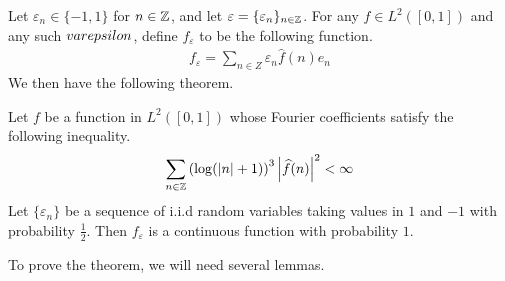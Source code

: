 \documentclass[11pt]{article}
\begin{document}
Let $\varepsilon_n \in \{-1, 1\}$ for $n \in \mathbb{Z}$, and let $\varepsilon = \{\varepsilon_n\}_{n \in \mathbb{Z}}$.
For any $f \in L^2([0,1])$ and any such $\\varepsilon$, define $f_{\varepsilon}$ to be the following function.
\begin{align*}
  f_{\varepsilon} = \sum_{n \in Z} \varepsilon_n \widehat{f}(n) e_n
\end{align*}
We then have the following theorem.
\begin{theorem}
  \label{thm:continuous-l2-function}
  Let $f$ be a function in $L^2([0,1])$ whose Fourier coefficients satisfy the following inequality.
  \begin{align*}
    \sum_{n \in \mathbb{Z}} \left( \log(|n| + 1) \right)^3 \left| \widehat{f}(n) \right|^2 < \infty
  \end{align*}
  Let $\{\varepsilon_n\}$ be a sequence of i.i.d random variables taking values in $1$ and $-1$ with probability $\frac{1}{2}$.
  Then $f_{\varepsilon}$ is a continuous function with probability $1$.
\end{theorem}

To prove the theorem, we will need several lemmas.
\end{document}
